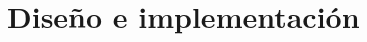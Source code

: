 \documentclass[a4paper, 12pt]{book}
\begin{document}
\cleardoublepage
\chapter{Diseño e implementación}
\label{sec:diseno}










 



\end{document}
